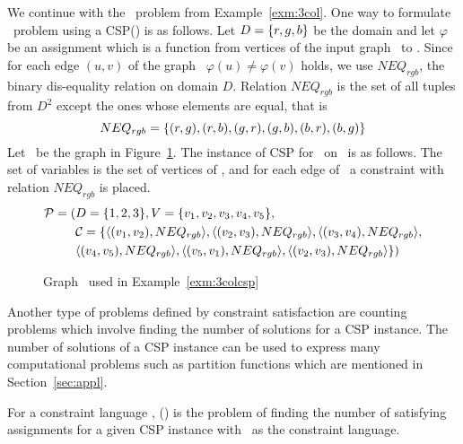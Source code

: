 \begin{example}[\tcoloring]\label{exm:3colcsp}
We continue with the \tcoloring\ problem from Example~\ref{exm:3col}.
One way to formulate \tcoloring\ problem using a CSP(\mrelset) is as follows.
Let  \(D=\{{r,g,b}\}\) be the domain and
let \(\varphi\) be an assignment which is a function from vertices of the input graph \mG\ to \mD\@.
Since for each edge \((u,v)\) of the graph \mG\ \(\varphi(u)\neq\varphi(v)\) holds,
we use \(NEQ_{rgb}\), the binary dis-equality relation on domain \(D\)\@. Relation \(NEQ_{rgb}\) is the set of all tuples from 
\(D^2\) except the ones whose elements are equal, that is
\[NEQ_{rgb}=\{{(r,g),(r,b),(g,r),(g,b),(b,r), (b,g)}\}\]
Let \mG\ be the graph in Figure~\ref{fig:sample}. The instance of 
CSP for \tcoloring\ on \mG\ is as follows. The set of variables is the set of vertices of \mG,
and for each edge of \mG\ a constraint with relation \(NEQ_{rgb}\) is placed.
\begin{align*}
\mathcal{P}=(&D=\{{1,2,3}\},V=\{{v_1,v_2,v_3,v_4,v_5}\}, \\
&\mathcal{C}=\{\langle (v_1,v_2),NEQ_{rgb} \rangle, \langle (v_2,v_3),NEQ_{rgb} \rangle,\langle (v_3,v_4),NEQ_{rgb} \rangle,\\
&\langle (v_4,v_5),NEQ_{rgb} \rangle, \langle (v_5,v_1),NEQ_{rgb} \rangle,
\langle (v_2,v_3),NEQ_{rgb} \rangle\})
\end{align*}
\end{example}
\begin{figure}
\centering

\caption{Graph \mG\ used in Example~\ref{exm:3colcsp}}\label{fig:sample}
\end{figure}


Another type of problems defined by constraint satisfaction are
counting problems which involve finding the number of solutions for a CSP instance.
The number of solutions of a CSP instance can be used to express many computational problems
such as partition functions which are mentioned in Section~\ref{sec:appl}.

\begin{defi}[\ccsp(\mrelset)] 
For a constraint language \mrelset,
\ccsp(\mrelset) is the problem of finding the number of satisfying assignments for a
given CSP instance with \mrelset\ as the constraint language.
\end{defi}

